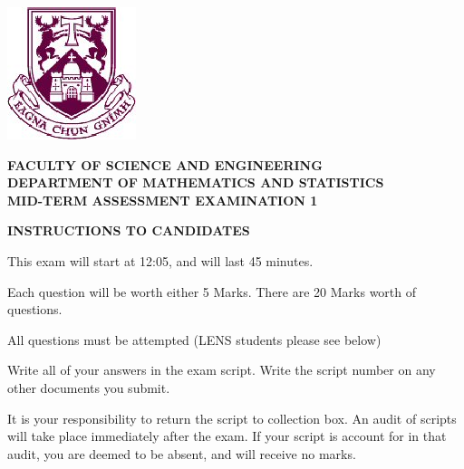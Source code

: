 \documentclass[a4paper,12pt]{article}
\begin{document}
\begin{center}
	\includegraphics[scale=0.60]{images/shieldtransparent2}
\end{center}

\begin{center}
	\vspace{1cm}
	\large \bf {FACULTY OF SCIENCE AND ENGINEERING} \\[0.5cm]
	\normalsize DEPARTMENT OF MATHEMATICS AND STATISTICS \\[1.25cm]
	\large \bf {MID-TERM ASSESSMENT EXAMINATION 1} \\[0.5cm]
\end{center}


\begin{center}
	{\bf INSTRUCTIONS TO CANDIDATES}
\end{center}
	\item This exam will start at 12:05, and will last 45 minutes.
	
	\item Each question will be worth either 5 Marks. There are 20 Marks worth of questions.
	\item All questions must be attempted (LENS students please see below)
	
	\item Write all of your answers in the exam script. Write the script number on any other documents you submit.
	
	\item It is your responsibility to return the script to collection box. An audit of scripts will take place immediately after the exam. If your script is account for in that audit,  you are deemed to be absent, and will receive no marks.
	
\end{document}
